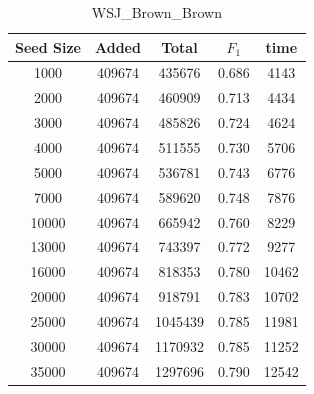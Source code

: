 \documentclass[journal, a4paper]{IEEEtran}
\begin{document}
		\begin{table}[!hbt]
		\begin{center}
		\caption{WSJ\_Brown\_Brown}
		\label{tab:3}
		\begin{tabular}{|c|c|c|c|c|}
			\hline
			Seed Size & Added & Total & $F_{1}$ & time\\ \hline
			  1000  & 409674 & 435676 & 0.686 & 4143\\ \hline
			  2000  & 409674 & 460909 & 0.713 & 4434\\ \hline
			  3000  & 409674 & 485826 & 0.724 & 4624\\ \hline
			  4000  & 409674 & 511555 & 0.730 & 5706\\ \hline
			  5000  & 409674 & 536781 & 0.743 & 6776\\ \hline
			  7000  & 409674 & 589620 & 0.748 & 7876\\ \hline
			  10000  & 409674 & 665942 & 0.760 & 8229\\ \hline
			  13000  & 409674 & 743397 & 0.772 & 9277\\ \hline
			  16000  & 409674 & 818353 & 0.780 & 10462\\ \hline
			  20000  & 409674 & 918791 & 0.783 & 10702\\ \hline
			  25000  & 409674 & 1045439 & 0.785 &11981\\ \hline
			  30000  & 409674 & 1170932 & 0.785 & 11252\\ \hline
			  35000  & 409674 & 1297696 & 0.790 & 12542\\
			 \hline
		\end{tabular}
		\end{center}
		\vspace{-5mm}
	\end{table}
	
\end{document}
